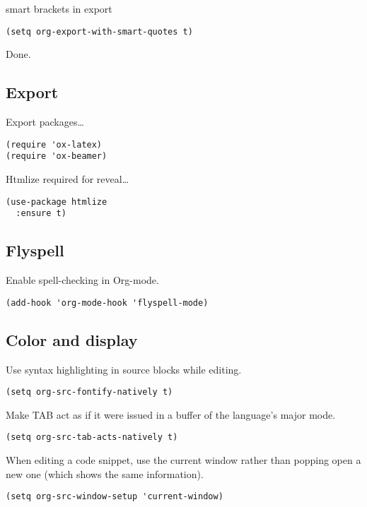 \documentclass[12pt]{article}
\begin{document}
smart brackets in export

\lstset{language=Lisp,label= ,caption= ,numbers=none}
\begin{lstlisting}
(setq org-export-with-smart-quotes t)
\end{lstlisting}

Done.
\subsection{Export}
\label{sec-5-5}

Export packages\ldots{}

\lstset{language=Lisp,label= ,caption= ,numbers=none}
\begin{lstlisting}
(require 'ox-latex)
(require 'ox-beamer)
\end{lstlisting}

Htmlize required for reveal\ldots{}

\lstset{language=Lisp,label= ,caption= ,numbers=none}
\begin{lstlisting}
(use-package htmlize
  :ensure t)
\end{lstlisting}

\subsection{Flyspell}
\label{sec-5-6}
Enable spell-checking in Org-mode.
\lstset{language=Lisp,label= ,caption= ,numbers=none}
\begin{lstlisting}
(add-hook 'org-mode-hook 'flyspell-mode)
\end{lstlisting}

\subsection{Color and display}
\label{sec-5-7}

Use syntax highlighting in source blocks while editing.
\lstset{language=Lisp,label= ,caption= ,numbers=none}
\begin{lstlisting}
(setq org-src-fontify-natively t)
\end{lstlisting}

Make TAB act as if it were issued in a buffer of the language’s major mode.
\lstset{language=Lisp,label= ,caption= ,numbers=none}
\begin{lstlisting}
(setq org-src-tab-acts-natively t)
\end{lstlisting}

When editing a code snippet, use the current window rather than popping open a
new one (which shows the same information).
\lstset{language=Lisp,label= ,caption= ,numbers=none}
\begin{lstlisting}
(setq org-src-window-setup 'current-window)
\end{lstlisting}
\end{document}
